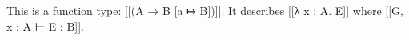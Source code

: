 This is a function type: [[(A → B [a ↦ B])]]. It describes [[λ x : A. E]] where [[G, x : A ⊢ E : B]].

